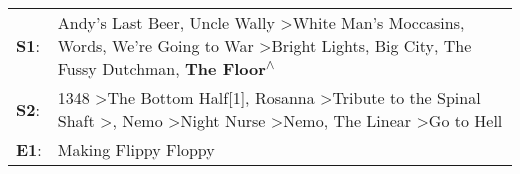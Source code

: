 \begin{supertabular}{p{0.03\textwidth}p{0.92\textwidth}}
 \textbf{S1}:  &                                                                     Andy's Last Beer\textsuperscript{}, \enspace Uncle Wally\textsuperscript{} \textgreater \enspace White Man's Moccasins\textsuperscript{}, \enspace Words\textsuperscript{}, \enspace We're Going to War\textsuperscript{} \textgreater \enspace Bright Lights, Big City\textsuperscript{}, \enspace The Fussy Dutchman\textsuperscript{}, \enspace \textbf{The Floor\textsuperscript{$\wedge$}}  \enspace  \\
 \textbf{S2}:  &  1348\textsuperscript{} \textgreater \enspace The Bottom Half[1]\textsuperscript{}, \enspace Rosanna\textsuperscript{} \textgreater \enspace Tribute to the Spinal Shaft\textsuperscript{} \textgreater {}\textsuperscript{}, \enspace Nemo\textsuperscript{} \textgreater \enspace Night Nurse\textsuperscript{} \textgreater \enspace Nemo\textsuperscript{}, \enspace The Linear\textsuperscript{} \textgreater \enspace Go to Hell\textsuperscript{}  \enspace  \\
 \textbf{E1}:  &                                                                                                                                                                                                                                                                                                                                                                                                                              Making Flippy Floppy\textsuperscript{}  \enspace  \\
\end{supertabular}
